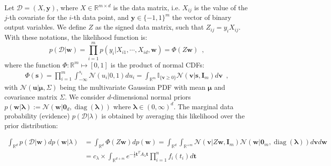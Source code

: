 \documentclass{article} %
\renewcommand{\t}{\mathbf{t}}
\newcommand{\dataset}{\mathcal{D}}
\newcommand{\diag}[1]{\mathop{\textrm{diag}}\left(#1\right)}
\newcommand{\normdist}{\mathcal{N}}
\newcommand{\s}{s}
\newcommand{\transp}{^{T}}
\def\Indic#1{\mathbb{I}_{\{#1\}}}
\def\w{\mathbf{w}}
\def\u{\mathbf{u}}
\def\s{\mathbf{s}}
\def\v{\mathbf{v}}
\def\X{X}
\def\Z{Z}
\def\y{\mathbf{y}}
\def\eye{\mathbf{I}}
\def\bzeros{\mathbf{0}}
\def\proba{p}
\renewcommand{\Re}{\mathbb{R}}
\begin{document}
Let $\dataset=(\X,\y)$, where $\X\in\Re^{m\times d}$ is the data matrix, i.e.
$X_{ij}$ is the value of the $j$-th covariate for the $i$-th data point, and
$\y\in\{-1,1\}^m$ the vector of binary output variables. We define $\Z$ as the
signed data matrix, such that $\Z_{ij} = y_i X_{ij}$.
With these notations, the likelihood function is:
$$ \proba(\dataset|\w) = \prod_{i=1}^m \proba(y_i|X_{i1},\cdots,X_{id},\w)  =
\Phi(\Z\w) \enspace, $$ where the function $\Phi:\Re^m\mapsto [0,1]$ 
is the product of normal CDFs:
\begin{align}
\Phi(\s)
= 
\prod_{i=1}^m \int_{-\infty}^{s_i} \normdist(u_i|0,1) du_i 
=
\int_{\Re^m}
\Indic{\v  \ge 0} \normdist(\v|\s,\eye_m) d\v \enspace,
\nonumber
\end{align}
 with
$\normdist(\u|\bm\mu,\Sigma)$ being the multivariate Gaussian PDF with mean $\bm\mu$ and
covariance matrix $\Sigma$.
\newcommand{\blambda}{\bm{\lambda}}
We consider $d$-dimensional normal priors $\proba(\w|\blambda):=\normdist(\w| \bzeros_d,\diag{\blambda})$
where $\blambda\in (0,\infty)^d$.
The marginal data probability (evidence) $\proba(\dataset|\lambda)$ is obtained by averaging this
likelihood over the prior distribution:

\begin{align}
\int_{\Re^d} \proba(\dataset|\w) d\proba(\w|\lambda)
&=
\int_{\Re^d} \Phi(\Z\w) d\proba(\w)
 =\int_{\Re^{d}}\int_{\Re^{+m}} %
 \normdist(\v|\Z\w,\eye_m) \normdist(\w|\bzeros_m,\diag{\blambda}) d\v d\w
\nonumber\\
&= c_\lambda \times \int_{\Re^{d+m}}e^{-\frac 12 \t\transp A_\lambda \t}  \prod_{i=1}^{n} f_i(t_i)  d\t
\label{prod-space}
\end{align}
\end{document}
